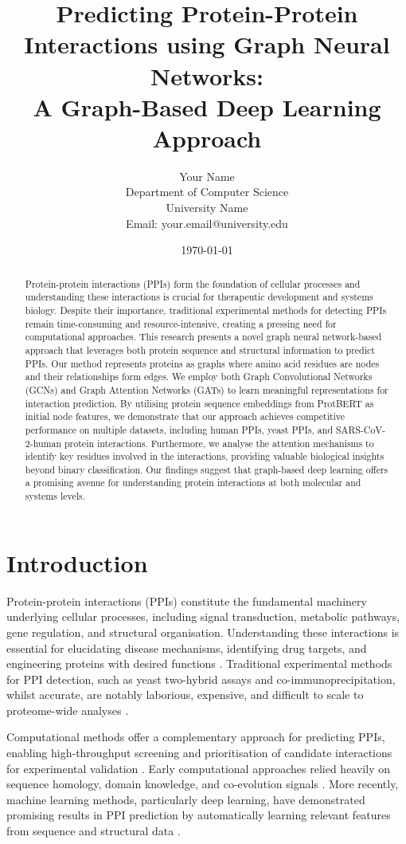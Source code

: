 \documentclass[12pt,a4paper]{article}
\title{Predicting Protein-Protein Interactions using Graph Neural Networks:\\A Graph-Based Deep Learning Approach}
\author{Your Name \\
  Department of Computer Science \\
  University Name \\
  Email: your.email@university.edu}
\date{\today}
\begin{document}
\maketitle

\begin{abstract}
Protein-protein interactions (PPIs) form the foundation of cellular processes and understanding these interactions is crucial for therapeutic development and systems biology. Despite their importance, traditional experimental methods for detecting PPIs remain time-consuming and resource-intensive, creating a pressing need for computational approaches. This research presents a novel graph neural network-based approach that leverages both protein sequence and structural information to predict PPIs. Our method represents proteins as graphs where amino acid residues are nodes and their relationships form edges. We employ both Graph Convolutional Networks (GCNs) and Graph Attention Networks (GATs) to learn meaningful representations for interaction prediction. By utilising protein sequence embeddings from ProtBERT as initial node features, we demonstrate that our approach achieves competitive performance on multiple datasets, including human PPIs, yeast PPIs, and SARS-CoV-2-human protein interactions. Furthermore, we analyse the attention mechanisms to identify key residues involved in the interactions, providing valuable biological insights beyond binary classification. Our findings suggest that graph-based deep learning offers a promising avenue for understanding protein interactions at both molecular and systems levels.
\end{abstract}

\section{Introduction}

Protein-protein interactions (PPIs) constitute the fundamental machinery underlying cellular processes, including signal transduction, metabolic pathways, gene regulation, and structural organisation. Understanding these interactions is essential for elucidating disease mechanisms, identifying drug targets, and engineering proteins with desired functions \cite{gonzalez2012protein}. Traditional experimental methods for PPI detection, such as yeast two-hybrid assays and co-immunoprecipitation, whilst accurate, are notably laborious, expensive, and difficult to scale to proteome-wide analyses \cite{berggard2007methods}.

Computational methods offer a complementary approach for predicting PPIs, enabling high-throughput screening and prioritisation of candidate interactions for experimental validation \cite{skrabanek2008computational}. Early computational approaches relied heavily on sequence homology, domain knowledge, and co-evolution signals \cite{valencia2002computational}. More recently, machine learning methods, particularly deep learning, have demonstrated promising results in PPI prediction by automatically learning relevant features from sequence and structural data \cite{chen2019review}.
\end{document}
